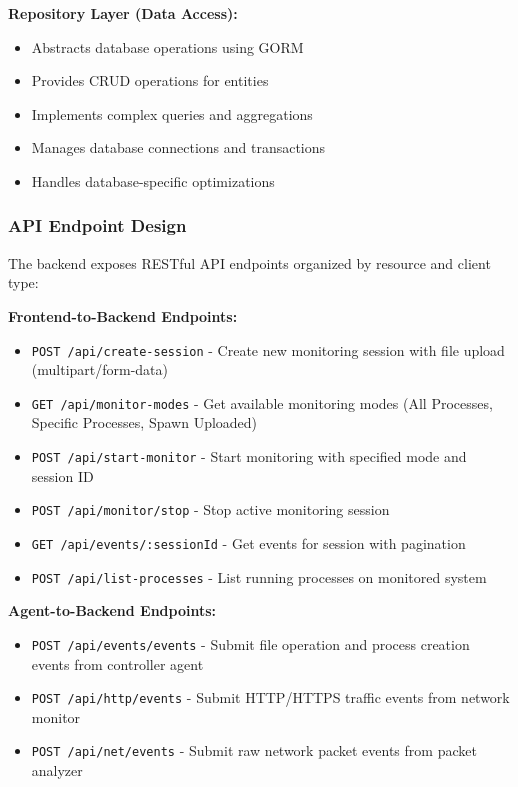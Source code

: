 \textbf{Repository Layer (Data Access):}
\begin{itemize}
    \item Abstracts database operations using GORM
    \item Provides CRUD operations for entities
    \item Implements complex queries and aggregations
    \item Manages database connections and transactions
    \item Handles database-specific optimizations
\end{itemize}

\subsubsection{API Endpoint Design}

The backend exposes RESTful API endpoints organized by resource and client type:

\textbf{Frontend-to-Backend Endpoints:}
\begin{itemize}
    \item \texttt{POST /api/create-session} - Create new monitoring session with file upload (multipart/form-data)
    \item \texttt{GET /api/monitor-modes} - Get available monitoring modes (All Processes, Specific Processes, Spawn Uploaded)
    \item \texttt{POST /api/start-monitor} - Start monitoring with specified mode and session ID
    \item \texttt{POST /api/monitor/stop} - Stop active monitoring session
    \item \texttt{GET /api/events/:sessionId} - Get events for session with pagination
    \item \texttt{POST /api/list-processes} - List running processes on monitored system
\end{itemize}

\textbf{Agent-to-Backend Endpoints:}
\begin{itemize}
    \item \texttt{POST /api/events/events} - Submit file operation and process creation events from controller agent
    \item \texttt{POST /api/http/events} - Submit HTTP/HTTPS traffic events from network monitor
    \item \texttt{POST /api/net/events} - Submit raw network packet events from packet analyzer
\end{itemize}

